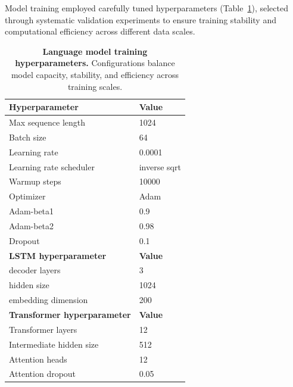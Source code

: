 Model training employed carefully tuned hyperparameters (Table~\ref{tab:model}), selected through systematic validation experiments to ensure training stability and computational efficiency across different data scales.


\begin{table}[ht]
\centering
\begin{tabular}{@{} l l @{}}
\hline
\textbf{Hyperparameter} & \textbf{Value} \\
\hline
Max sequence length & 1024 \\
Batch size & 64 \\
Learning rate & 0.0001 \\
Learning rate scheduler & inverse sqrt \\
Warmup steps & 10000 \\
Optimizer & Adam \\
Adam-beta1 & 0.9 \\
Adam-beta2 & 0.98 \\
Dropout & 0.1 \\
\hline
\textbf{LSTM hyperparameter} & \textbf{Value} \\
\hline
decoder layers & 3 \\
hidden size & 1024 \\
embedding dimension & 200 \\
\hline
\textbf{Transformer hyperparameter} & \textbf{Value} \\
\hline
Transformer layers & 12 \\
Intermediate hidden size & 512 \\
Attention heads & 12 \\
Attention dropout & 0.05 \\
\hline
\end{tabular}
\caption{\textbf{Language model training hyperparameters.} Configurations balance model capacity, stability, and efficiency across training scales.}
\label{tab:model}
\end{table}


